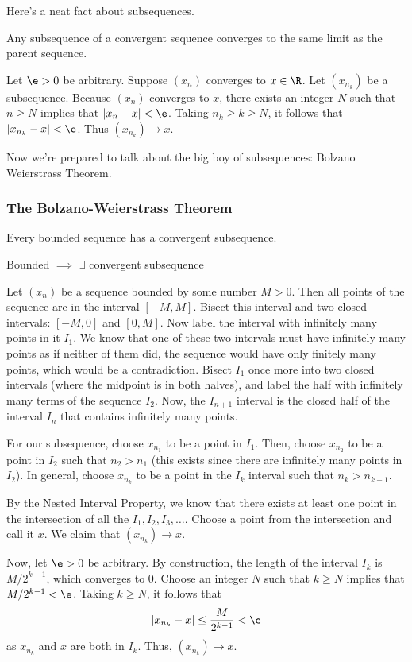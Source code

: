 \documentclass[class=article, crop=false]{standalone}
\begin{document}
Here's a neat fact about subsequences.
\begin{fact}
    Any subsequence of a convergent sequence converges to the same limit as the parent sequence.
\end{fact}
\begin{pf}
    Let $\e > 0$ be arbitrary. Suppose $(x_n)$ converges to $x \in \R$. Let $(x_{n_k})$ be a subsequence. Because $(x_n)$ converges to $x$, there exists an integer $N$ such that $n \geq N$ implies that $|x_n - x| < \e$. Taking $n_k \geq k \geq N$, it follows that $|x_{n_k}-x| < \e$. Thus $(x_{n_k}) \to x$.
\end{pf}

Now we're prepared to talk about the big boy of subsequences: Bolzano Weierstrass Theorem.

\subsubsection*{The Bolzano-Weierstrass Theorem}

\begin{thm}
    Every bounded sequence has a convergent subsequence.
\end{thm}
\begin{slogan}
    Bounded $\implies$ $\exists$ convergent subsequence
\end{slogan}

\begin{pf}
    Let $(x_n)$ be a sequence bounded by some number $M > 0$. Then all points of the sequence are in the interval $[-M,M]$. Bisect this interval and two closed intervals: $[-M,0]$ and $[0,M]$. Now label the interval with infinitely many points in it $I_1$. We know that one of these two intervals must have infinitely many points as if neither of them did, the sequence would have only finitely many points, which would be a contradiction. Bisect $I_1$ once more into two closed intervals (where the midpoint is in both halves), and label the half with infinitely many terms of the sequence $I_2$. Now, the $I_{n+1}$ interval is the closed half of the interval $I_n$ that contains infinitely many points.

    For our subsequence, choose $x_{n_1}$ to be a point in $I_1$. Then, choose $x_{n_2}$ to be a point in $I_2$ such that $n_2 > n_1$ (this exists since there are infinitely many points in $I_2$). In general, choose $x_{n_k}$ to be a point in the $I_k$ interval such that $n_k > n_{k-1}$.

    By the Nested Interval Property, we know that there exists at least one point in the intersection of all the $I_1, I_2, I_3, \ldots$. Choose a point from the intersection and call it $x$. We claim that $(x_{n_k}) \to x$.

    Now, let $\e > 0$ be arbitrary. By construction, the length of the interval $I_k$ is $M/2^{k-1}$, which converges to 0. Choose an integer $N$ such that $k \geq N$ implies that $M/2^{k-1} < \e$. Taking $k \geq N$, it follows that
        \[
            |x_{n_k}-x| \leq \frac{M}{2^{k-1}} < \e
        \]
    as $x_{n_k}$ and $x$ are both in $I_k$. Thus, $(x_{n_k}) \to x$.
\end{pf}
\end{document}
